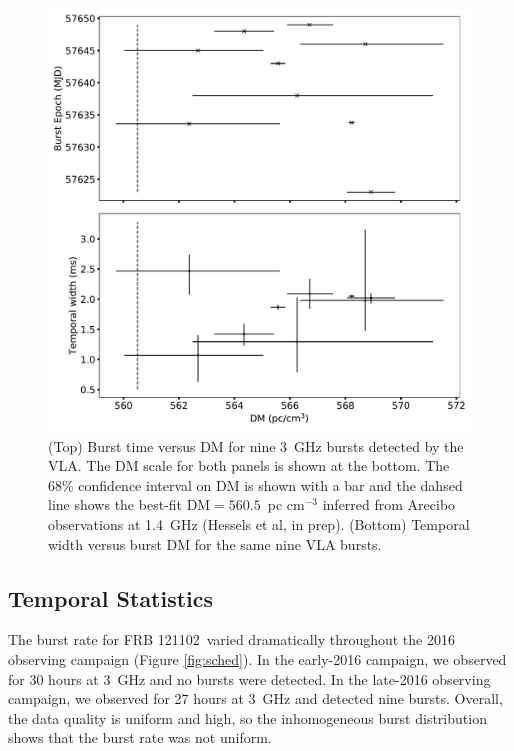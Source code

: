 \documentclass[twocolumn]{aastex61}
\newcommand{\frb}{FRB 121102}
\begin{document}
\begin{figure}[htb]
\begin{center}
\includegraphics[width=\columnwidth]{burst_dmdt}
\caption{(Top) Burst time versus DM for nine 3~GHz bursts detected by the VLA. The DM scale for both panels is shown at the bottom. The 68\% confidence interval on DM is shown with a bar and the dahsed line shows the best-fit DM$=560.5$\ pc cm$^{-3}$ inferred from Arecibo observations at 1.4~GHz (Hessels et al, in prep). (Bottom) Temporal width versus burst DM for the same nine VLA bursts.
\label{fig:dmmodel}}
\end{center}
\end{figure}

\subsection{Temporal Statistics}
\label{sec:temp}

The burst rate for \frb\ varied dramatically throughout the 2016 observing campaign (Figure \ref{fig:sched}). In the early-2016 campaign, we observed for 30 hours at 3~GHz and no bursts were detected. In the late-2016 observing campaign, we observed for 27 hours at 3~GHz and detected nine bursts. Overall, the data quality is uniform and high, so the inhomogeneous burst distribution shows that the burst rate was not uniform.
\end{document}
